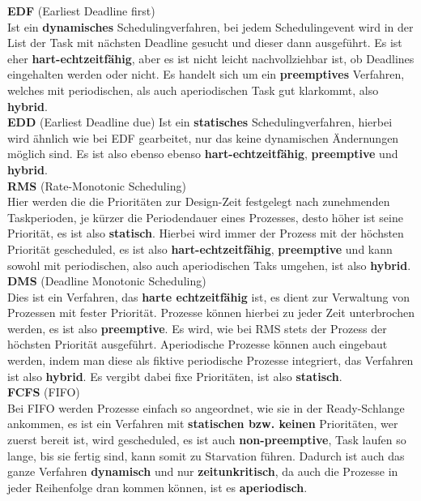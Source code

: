 \documentclass[12pt,a4paper,ngerman]{article}
\begin{document}
\textbf{EDF} (Earliest Deadline first)\\
Ist ein \textbf{dynamisches} Schedulingverfahren, bei jedem Schedulingevent wird in der List der Task mit nächsten Deadline gesucht und dieser dann ausgeführt. Es ist eher \textbf{hart-echtzeitfähig}, aber es ist nicht leicht nachvollziehbar ist, ob Deadlines eingehalten werden oder nicht. Es handelt sich um ein \textbf{preemptives} Verfahren, welches mit periodischen, als auch aperiodischen Task gut klarkommt, also \textbf{hybrid}. 
\\
\textbf{EDD} (Earliest Deadline due) 
Ist ein \textbf{statisches }Schedulingverfahren, hierbei wird ähnlich wie bei EDF gearbeitet, nur das keine dynamischen Ändernungen möglich sind. Es ist also ebenso ebenso \textbf{hart-echtzeitfähig}, \textbf{preemptive} und \textbf{hybrid}. \\
\textbf{RMS} (Rate-Monotonic Scheduling) \\
Hier werden die die Prioritäten zur Design-Zeit festgelegt nach zunehmenden Taskperioden, je kürzer die Periodendauer eines Prozesses, desto höher ist seine Priorität, es ist also \textbf{statisch}. 
Hierbei wird immer der Prozess mit der höchsten Priorität gescheduled, es ist also \textbf{hart-echtzeitfähig}, \textbf{preemptive} und kann sowohl mit periodischen, also auch aperiodischen Taks umgehen, ist also \textbf{hybrid}.  \\
\textbf{DMS} (Deadline Monotonic Scheduling) \\
Dies ist ein 	Verfahren, das \textbf{harte echtzeitfähig} ist, es dient zur Verwaltung von Prozessen mit fester Priorität.
Prozesse können hierbei zu jeder Zeit unterbrochen werden, es ist also \textbf{preemptive}. Es wird, wie bei RMS stets der Prozess der höchsten Priorität ausgeführt. Aperiodische Prozesse können auch eingebaut werden, indem man diese als fiktive periodische Prozesse integriert, das Verfahren ist also \textbf{hybrid}.  Es vergibt dabei fixe Prioritäten, ist also \textbf{statisch}.\\
\textbf{FCFS} (FIFO) \\
Bei FIFO werden Prozesse einfach so angeordnet, wie sie in der Ready-Schlange ankommen, es ist ein Verfahren mit \textbf{statischen bzw. keinen} Prioritäten, wer zuerst bereit ist, wird gescheduled, es ist auch \textbf{non-preemptive}, Task laufen so lange, bis sie fertig sind, kann somit zu Starvation führen. Dadurch ist auch das ganze Verfahren \textbf{dynamisch} und nur \textbf{zeitunkritisch}, da auch die Prozesse in jeder Reihenfolge dran kommen können, ist es \textbf{aperiodisch}.  \\
\end{document}

